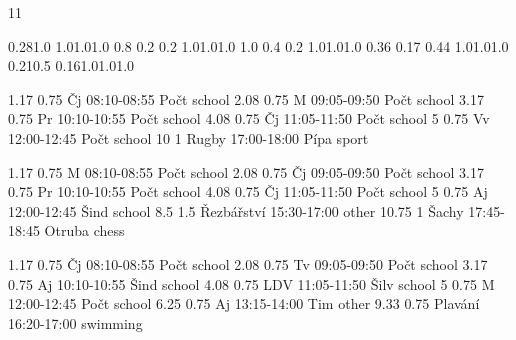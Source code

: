 \documentclass[a4paper,10pt]{report}
\begin{document}
\thispagestyle{empty}
\begin{landscape}
\setslotsize{2.5cm}{0.9cm}
 {11}
\settextframe{0.8mm}




 {0.28}{1.0} {1.0}{1.0}{1.0}
    {0.8} {0.2} {0.2} {1.0}{1.0}{1.0}
 {1.0} {0.4} {0.2} {1.0}{1.0}{1.0}
 {0.36} {0.17} {0.44} {1.0}{1.0}{1.0}
       {0.21}{0.5} {0.16}{1.0}{1.0}{1.0}

\begin{timetable}
   
   {1.17} {0.75} {Čj}                {08:10-08:55}        {Počt}     {school}
   {2.08} {0.75} {M}                 {09:05-09:50}        {Počt}     {school}
   {3.17} {0.75} {Pr}                {10:10-10:55}        {Počt}     {school}
   {4.08} {0.75} {Čj}                {11:05-11:50}        {Počt}     {school}
   {5} {0.75}    {Vv}                {12:00-12:45}        {Počt}     {school}
   {10} {1}      {Rugby}             {17:00-18:00}        {Pípa}     {sport}
  
   {1.17} {0.75} {M}                 {08:10-08:55}        {Počt}     {school}
   {2.08} {0.75} {Čj}                {09:05-09:50}        {Počt}     {school}
   {3.17} {0.75} {Pr}                {10:10-10:55}        {Počt}     {school}
   {4.08} {0.75} {Čj}                {11:05-11:50}        {Počt}     {school}
   {5} {0.75}    {Aj}                {12:00-12:45}        {Šind}     {school}
   {8.5} {1.5}   {Řezbářství}        {15:30-17:00}        {}         {other}
   {10.75} {1}   {Šachy}             {17:45-18:45}        {Otruba}   {chess}
    
   {1.17} {0.75} {Čj}                 {08:10-08:55}       {Počt}     {school}
   {2.08} {0.75} {Tv}                 {09:05-09:50}       {Počt}     {school}
   {3.17} {0.75} {Aj}                 {10:10-10:55}       {Šind}     {school}
   {4.08} {0.75} {LDV}                {11:05-11:50}       {Šilv}     {school}
   {5} {0.75}    {M}                  {12:00-12:45}       {Počt}     {school}
   {6.25} {0.75} {Aj}                 {13:15-14:00}       {Tim}      {other}
   {9.33} {0.75} {Plavání}            {16:20-17:00}       {}         {swimming}
  

\end{timetable}
\end{landscape}
\end{document}
